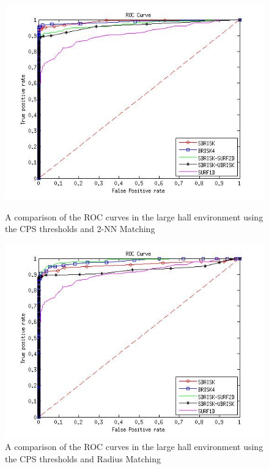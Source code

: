 \begin{figure}[ht!]
\begin{minipage}[b]{0.5\linewidth}
\includegraphics[scale=0.4]{../Drawings/dataset3_ROC_General_KNN_Consistent.jpg}
\caption{A comparison of the ROC curves in the large hall environment using the CPS thresholds and 2-NN Matching}
\label{fig:compareKnnConsistentOffice3}
\end{minipage}
\hspace{0.5cm}
\begin{minipage}[b]{0.5\linewidth}
\includegraphics[scale=0.4]{../Drawings/dataset3_ROC_General_Hamming_Consistent.jpg}
\caption{A comparison of the ROC curves in the large hall environment using the CPS thresholds and Radius Matching}
\label{fig:compareHammingConsistentOffice3}
\end{minipage}
\end{figure}

